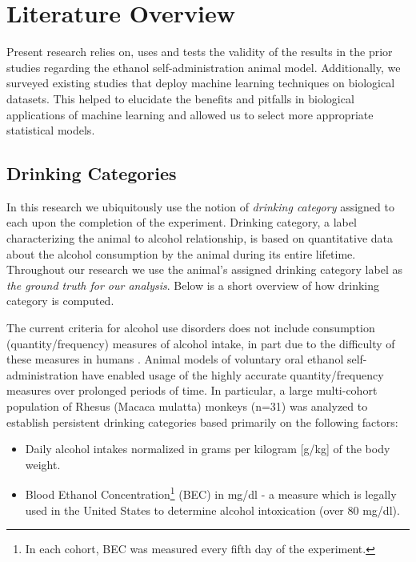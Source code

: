 \chapter{Literature Overview}
Present research relies on, uses and tests the validity of the results in the prior studies regarding the ethanol self-administration animal model. Additionally, we surveyed existing studies that deploy machine learning techniques on biological datasets. This helped to elucidate the benefits and pitfalls in biological applications of machine learning and allowed us to select more appropriate statistical models. 

\section{Drinking Categories}
In this research we ubiquitously use the notion of \textit{drinking category} assigned to each upon the completion of the experiment. Drinking category, a label characterizing the animal to alcohol relationship, is based on quantitative data about the alcohol consumption by the animal during its entire lifetime. Throughout our research we use the animal's assigned drinking category label as \textit{the ground truth for our analysis}. Below is a short overview of how drinking category is computed. 

The current criteria for alcohol use disorders does not include consumption (quantity/frequency) measures of alcohol intake, in part due to the difficulty of these measures in humans . Animal models of voluntary oral ethanol self-administration have enabled usage of the highly accurate quantity/frequency measures over prolonged periods of time. In particular, a large multi-cohort population of Rhesus (Macaca mulatta) monkeys (n=31) was analyzed to establish persistent drinking categories based primarily on the following factors:
\begin{itemize}
	\item Daily alcohol intakes normalized in grams per kilogram [g/kg] of the body weight.
	\item Blood Ethanol Concentration\footnote{In each cohort, BEC was measured every fifth day of the experiment.} (BEC) in mg/dl - a measure which is legally used in the United States to determine alcohol intoxication (over 80 mg/dl). 
\end{itemize}

